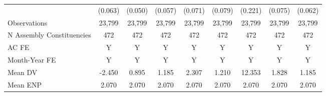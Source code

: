 {\begin{tabular}{l*{8}{c}}
            &     (0.063)         &     (0.050)         &     (0.057)         &     (0.071)         &     (0.079)         &     (0.221)         &     (0.075)         &     (0.062)         \\
Observations&      23,799         &      23,799         &      23,799         &      23,799         &      23,799         &      23,799         &      23,799         &      23,799         \\
N Assembly Constituencies&         472         &         472         &         472         &         472         &         472         &         472         &         472         &         472         \\
AC FE       &           Y         &           Y         &           Y         &           Y         &           Y         &           Y         &           Y         &           Y         \\
Month-Year FE&           Y         &           Y         &           Y         &           Y         &           Y         &           Y         &           Y         &           Y         \\
Mean DV     &      -2.450         &       0.895         &       1.185         &       2.307         &       1.210         &      12.353         &       1.828         &       1.185         \\
Mean ENP    &       2.070         &       2.070         &       2.070         &       2.070         &       2.070         &       2.070         &       2.070         &       2.070         \\
\bottomrule
\end{tabular}
}
